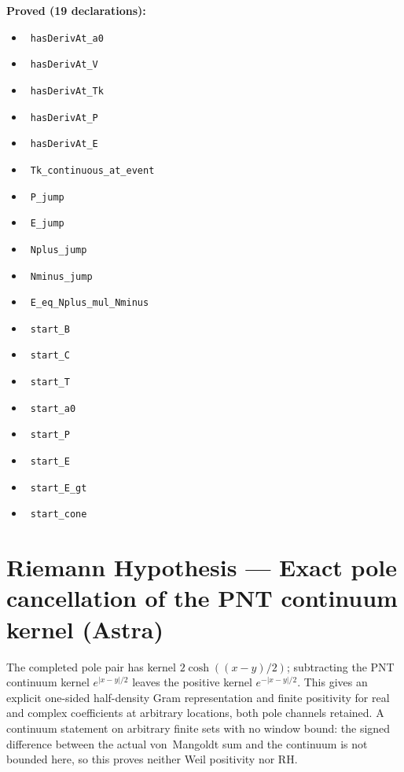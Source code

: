 \documentclass{report}
\theoremstyle{definition}
\begin{document}
\begin{itemize}
\noindent\textbf{Proved (19 declarations):}
\begin{itemize}
  \item {}\leanok\ \texttt{hasDerivAt\_a0}
  \item {}\leanok\ \texttt{hasDerivAt\_V}
  \item {}\leanok\ \texttt{hasDerivAt\_Tk}
  \item {}\leanok\ \texttt{hasDerivAt\_P}
  \item {}\leanok\ \texttt{hasDerivAt\_E}
  \item {}\leanok\ \texttt{Tk\_continuous\_at\_event}
  \item {}\leanok\ \texttt{P\_jump}
  \item {}\leanok\ \texttt{E\_jump}
  \item {}\leanok\ \texttt{Nplus\_jump}
  \item {}\leanok\ \texttt{Nminus\_jump}
  \item {}\leanok\ \texttt{E\_eq\_Nplus\_mul\_Nminus}
  \item {}\leanok\ \texttt{start\_B}
  \item {}\leanok\ \texttt{start\_C}
  \item {}\leanok\ \texttt{start\_T}
  \item {}\leanok\ \texttt{start\_a0}
  \item {}\leanok\ \texttt{start\_P}
  \item {}\leanok\ \texttt{start\_E}
  \item {}\leanok\ \texttt{start\_E\_gt}
  \item {}\leanok\ \texttt{start\_cone}
\end{itemize}

\section{Riemann Hypothesis --- Exact pole cancellation of the PNT continuum kernel (Astra)}
The completed pole pair has kernel $2\cosh((x-y)/2)$; subtracting the PNT continuum kernel $e^{|x-y|/2}$ leaves the positive kernel $e^{-|x-y|/2}$. This gives an explicit one-sided half-density Gram representation and finite positivity for real and complex coefficients at arbitrary locations, both pole channels retained. A continuum statement on arbitrary finite sets with no window bound: the signed difference between the actual von~Mangoldt sum and the continuum is not bounded here, so this proves neither Weil positivity nor RH.


\end{itemize}
\end{document}
